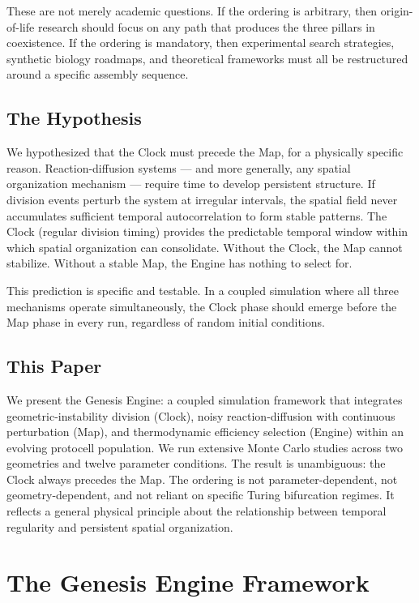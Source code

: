 \documentclass[11pt,letterpaper]{article}
\begin{document}
These are not merely academic questions. If the ordering is arbitrary, then origin-of-life research should focus on any path that produces the three pillars in coexistence. If the ordering is mandatory, then experimental search strategies, synthetic biology roadmaps, and theoretical frameworks must all be restructured around a specific assembly sequence.

\subsection{The Hypothesis}

We hypothesized that the Clock must precede the Map, for a physically specific reason. Reaction-diffusion systems --- and more generally, any spatial organization mechanism --- require time to develop persistent structure. If division events perturb the system at irregular intervals, the spatial field never accumulates sufficient temporal autocorrelation to form stable patterns. The Clock (regular division timing) provides the predictable temporal window within which spatial organization can consolidate. Without the Clock, the Map cannot stabilize. Without a stable Map, the Engine has nothing to select for.

This prediction is specific and testable. In a coupled simulation where all three mechanisms operate simultaneously, the Clock phase should emerge before the Map phase in every run, regardless of random initial conditions.

\subsection{This Paper}

We present the Genesis Engine: a coupled simulation framework that integrates geometric-instability division (Clock), noisy reaction-diffusion with continuous perturbation (Map), and thermodynamic efficiency selection (Engine) within an evolving protocell population. We run extensive Monte Carlo studies across two geometries and twelve parameter conditions. The result is unambiguous: the Clock always precedes the Map. The ordering is not parameter-dependent, not geometry-dependent, and not reliant on specific Turing bifurcation regimes. It reflects a general physical principle about the relationship between temporal regularity and persistent spatial organization.

\section{The Genesis Engine Framework}
\end{document}
